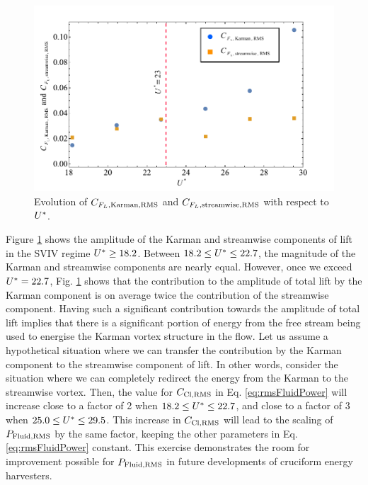 \documentclass[oneside]{utmthesis}
\begin{document}
\begin{figure}
  \centering
  \includegraphics[width=1\textwidth]{figs/karmanStreamwiseComponents}
  \caption{Evolution of $C_{F_{L},\text{Karman},\text{RMS}}$ and $C_{F_{L},\text{streamwise},\text{RMS}}$ with respect to $U^{*}$.}
  \label{fig:karmanStreamwiseComponents}
\end{figure}

Figure \ref{fig:karmanStreamwiseComponents} shows the \rms{} amplitude of the Karman and streamwise components of lift in the SVIV regime $U^{*} \geq 18.2$. Between $18.2 \leq U^{*} \leq 22.7$, the magnitude of the Karman and streamwise components are nearly equal. However, once we exceed $U^{*} = 22.7$, Fig. \ref{fig:karmanStreamwiseComponents} shows that the contribution to the \rms{} amplitude of total lift by the Karman component is on average twice the contribution of the streamwise component. Having such a significant contribution towards the \rms{} amplitude of total lift implies that there is a significant portion of energy from the free stream being used to energise the Karman vortex structure in the flow. Let us assume a hypothetical situation where we can transfer the contribution by the Karman component to the streamwise component of lift. In other words, consider the situation where we can completely redirect the energy from the Karman to the streamwise vortex. Then, the value for $C_{\text{Cl},\text{RMS}}$ in Eq. \ref{eq:rmsFluidPower} will increase close to a factor of 2 when $18.2 \leq U^{*} \leq 22.7$, and close to a factor of 3 when $25.0 \leq U^{*} \leq 29.5$. This increase in $C_{\text{Cl},\text{RMS}}$ will lead to the scaling of $P_{\text{Fluid,RMS}}$ by the same factor, keeping the other parameters in Eq. \ref{eq:rmsFluidPower} constant. This exercise demonstrates the room for improvement possible for $P_{\text{Fluid,RMS}}$ in future developments of cruciform energy harvesters.
\end{document}
